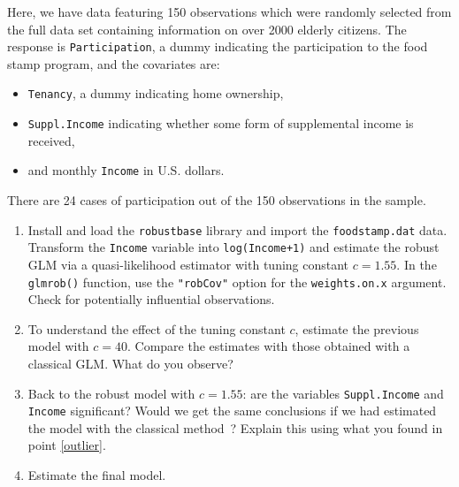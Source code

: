 \documentclass[a4paper,12pt]{article}\usepackage[]{graphicx}\usepackage[]{color}
\begin{document}
Here, we have data featuring 150 observations which were randomly selected from the full data set containing information on over 2000 elderly citizens. The response is \texttt{Participation}, a dummy indicating the participation to the food stamp program, and the covariates are:
\begin{itemize}
\item{\texttt{Tenancy}, a dummy indicating home ownership,}
\item{\texttt{Suppl.Income} indicating whether some form of supplemental income is received,}
\item{and monthly \texttt{Income} in U.S. dollars.}
\end{itemize}
There are 24 cases of participation out of the 150 observations in the sample.
\begin{enumerate}[ref=\bf{\alph*)}]
\item\label{outlier}{Install and load the \texttt{robustbase} library and import the \texttt{foodstamp.dat} data. Transform the \verb"Income" variable into \verb"log(Income+1)" and estimate the robust GLM via a quasi-likelihood estimator with tuning constant $c=1.55$. In the \texttt{glmrob()} function, use the \texttt{"robCov"} option for the \texttt{weights.on.x} argument. Check for potentially influential observations.}
\item{To understand the effect of the tuning constant $c$, estimate the previous model with $c=40$. Compare the estimates with those obtained with a classical GLM. What do you observe?}
\item{Back to the robust model with $c=1.55$: are the variables \verb"Suppl.Income" and \verb"Income" significant? Would we get the same conclusions if we had estimated the model with the classical method~? Explain this using what you found in point \ref{outlier}.}
\item{Estimate the final model.}
\end{enumerate}

% 
\end{document}
